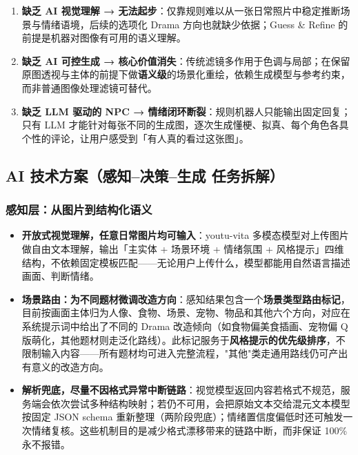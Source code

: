 \documentclass[10pt, a4paper]{article}
\newcommand{\kw}[1]{\textbf{#1}}
\newcommand{\model}[1]{{\small\ttfamily\color{TokenPurple}#1}}
\begin{document}
\vspace{4pt}
\begin{enumerate}[leftmargin=2em, itemsep=0.35em, topsep=3pt]
  \item \kw{缺乏 AI 视觉理解 → 无法起步}：仅靠规则难以从一张日常照片中稳定推断场景与情绪语境，后续的选项化 Drama 方向也就缺少依据；Guess \& Refine 的前提是机器对图像有可用的语义理解。

  \item \kw{缺乏 AI 可控生成 → 核心价值消失}：传统滤镜多作用于色调与局部；在保留原图透视与主体的前提下做\textbf{语义级}的场景化重绘，依赖生成模型与参考约束，而非普通图像处理滤镜可替代。

  \item \kw{缺乏 LLM 驱动的 NPC → 情绪闭环断裂}：规则机器人只能输出固定回复；只有 LLM 才能针对每张不同的生成图，逐次生成懂梗、拟真、每个角色各具个性的评论，让用户感受到「有人真的看过这张图」。
\end{enumerate}

\subsection{AI 技术方案（感知--决策--生成 任务拆解）}

\subsubsection*{感知层：从图片到结构化语义}

\begin{itemize}[leftmargin=2em, itemsep=0.3em, topsep=3pt]
  \item \kw{开放式视觉理解，任意日常图片均可输入}：\model{youtu-vita} 多模态模型对上传图片做自由文本理解，输出「主实体 + 场景环境 + 情绪氛围 + 风格提示」四维结构，不依赖固定模板匹配——无论用户上传什么，模型都能用自然语言描述画面、判断情绪。

  \item \kw{场景路由：为不同题材微调改造方向}：感知结果包含一个\textbf{场景类型路由标记}，目前按画面主体归为人像、食物、场景、宠物、物品和其他六个方向，对应在系统提示词中给出了不同的 Drama 改造倾向（如食物偏美食插画、宠物偏 Q 版萌化，其他题材则走泛化路线）。此标记服务于\textbf{风格提示的优先级排序}，不限制输入内容——所有题材均可进入完整流程，"其他"类走通用路线仍可产出有意义的改造方向。

  \item \kw{解析兜底，尽量不因格式异常中断链路}：视觉模型返回内容若格式不规范，服务端会依次尝试多种结构映射；若仍不可用，会把原始文本交给混元文本模型按固定 JSON schema 重新整理（两阶段兜底）；情绪置信度偏低时还可触发一次情绪复核。这些机制目的是减少格式漂移带来的链路中断，而非保证 100\% 永不报错。
\end{itemize}
\end{document}
